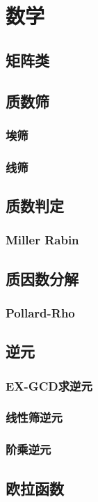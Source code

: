 \documentclass[twocolumn,a4]{article}
\newcommand{\addcpp}[1]{}
\begin{document}
\section{数学}
	\subsection{矩阵类}
	\subsection{质数筛}
		\subsubsection{埃筛}
		\subsubsection{线筛}
	\subsection{质数判定}
		\subsubsection{Miller Rabin}
			\addcpp{math/Miller-Rabin}
	\subsection{质因数分解}
		\subsubsection{Pollard-Rho}
			\addcpp{Pollard-rho}
	\subsection{逆元}
		\subsubsection{EX-GCD求逆元}
			\addcpp{math/EXGCD_INV}
		\subsubsection{线性筛逆元}
		\subsubsection{阶乘逆元}
	\subsection{欧拉函数}
\end{document}
